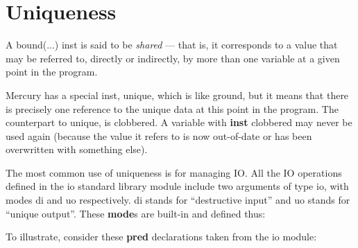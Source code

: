 \documentclass[a4paper,11pt,notitlepage,onecolumn]{book}
\begin{document}
\section{Uniqueness}

A \textsf{bound(...)} inst is said to be \emph{shared} --- that is, it corresponds
to a value that may be referred to, directly or indirectly, by more than one
variable at a given point in the program.

Mercury has a special inst, \textsf{unique}, which is like \textsf{ground}, but it means
that there is precisely one reference to the \textsf{unique} data at this point in
the program.  The counterpart to \textsf{unique}, is \textsf{clobbered}.  A variable with
\textsf{\textbf{inst}} \textsf{clobbered} may never be used again (\eg because the value it refers
to is now out-of-date or has been overwritten with something else).

The most common use of uniqueness is for managing IO.  All the IO operations
defined in the \textsf{io} standard library module include two arguments of type
\textsf{io}, with modes \textsf{di} and \textsf{uo} respectively.  \textsf{di} stands for ``destructive
input'' and \textsf{uo} stands for ``unique output''.  These \textsf{\textbf{mode}}s are built-in
and defined thus:

\begin{small}

\begin{ptabular}
\nextline
{}
\nextline
\end{ptabular}

\end{small}

To illustrate, consider these \textsf{\textbf{pred}} declarations taken from the \textsf{io}
module:

\begin{small}

\begin{ptabular}
\nextline
{}
\nextline
{}
\nextline
\end{ptabular}

\end{small}
\end{document}
